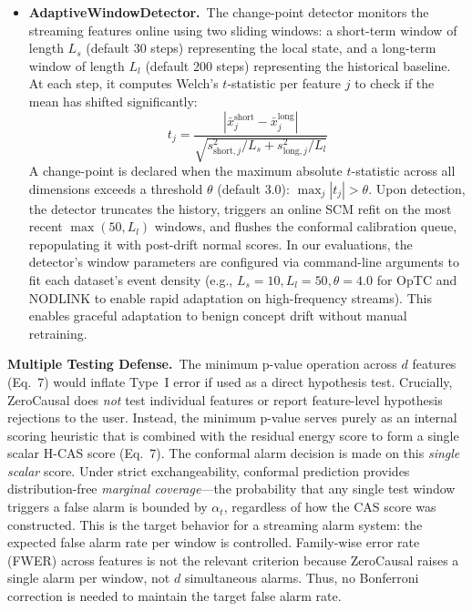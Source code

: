 \begin{itemize}
\item \textbf{AdaptiveWindowDetector.}~The change-point detector monitors the streaming features online using two sliding windows: a short-term window of length $L_s$ (default 30 steps) representing the local state, and a long-term window of length $L_l$ (default 200 steps) representing the historical baseline. At each step, it computes Welch's $t$-statistic per feature $j$ to check if the mean has shifted significantly:
\begin{equation}
t_j = \frac{|\bar{x}^{\text{short}}_j - \bar{x}^{\text{long}}_j|}{\sqrt{s^2_{\text{short},j}/L_s + s^2_{\text{long},j}/L_l}}
\end{equation}
A change-point is declared when the maximum absolute $t$-statistic across all dimensions exceeds a threshold $\theta$ (default 3.0): $\max_j |t_j| > \theta$. Upon detection, the detector truncates the history, triggers an online SCM refit on the most recent $\max(50, L_l)$ windows, and flushes the conformal calibration queue, repopulating it with post-drift normal scores. In our evaluations, the detector's window parameters are configured via command-line arguments to fit each dataset's event density (e.g., $L_s=10, L_l=50, \theta=4.0$ for OpTC and NODLINK to enable rapid adaptation on high-frequency streams). This enables graceful adaptation to benign concept drift without manual retraining.
\end{itemize}

\textbf{Multiple Testing Defense.}~The minimum p-value operation across $d$ features (Eq.~7) would inflate Type~I error if used as a direct hypothesis test. Crucially, ZeroCausal does \textit{not} test individual features or report feature-level hypothesis rejections to the user. Instead, the minimum p-value serves purely as an internal scoring heuristic that is combined with the residual energy score to form a single scalar H-CAS score (Eq.~7). The conformal alarm decision is made on this \textit{single scalar} score. Under strict exchangeability, conformal prediction provides distribution-free \textit{marginal coverage}---the probability that any single test window triggers a false alarm is bounded by $\alpha_t$, regardless of how the CAS score was constructed. This is the target behavior for a streaming alarm system: the expected false alarm rate per window is controlled. Family-wise error rate (FWER) across features is not the relevant criterion because ZeroCausal raises a single alarm per window, not $d$ simultaneous alarms. Thus, no Bonferroni correction is needed to maintain the target false alarm rate.
